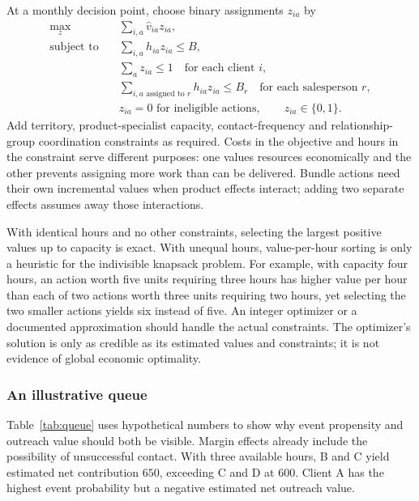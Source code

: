 At a monthly decision point, choose binary assignments $z_{ia}$ by
\begin{align}
 \max_z\quad &\sum_{i,a}\widehat v_{ia}z_{ia},\nonumber\\
 \text{subject to}\quad &\sum_{i,a}h_{ia}z_{ia}\le B,\nonumber\\
 &\sum_a z_{ia}\le1\quad\text{for each client }i,\nonumber\\
 &\sum_{i,a\text{ assigned to }r}h_{ia}z_{ia}\le B_r
       \quad\text{for each salesperson }r,\nonumber\\
 &z_{ia}=0\text{ for ineligible actions},\qquad z_{ia}\in\{0,1\}.
 \label{eq:mip}
\end{align}
Add territory, product-specialist capacity, contact-frequency and relationship-group coordination constraints as required. Costs in the objective and hours in the constraint serve different purposes: one values resources economically and the other prevents assigning more work than can be delivered. Bundle actions need their own incremental values when product effects interact; adding two separate effects assumes away those interactions.

With identical hours and no other constraints, selecting the largest positive values up to capacity is exact. With unequal hours, value-per-hour sorting is only a heuristic for the indivisible knapsack problem. For example, with capacity four hours, an action worth five units requiring three hours has higher value per hour than each of two actions worth three units requiring two hours, yet selecting the two smaller actions yields six instead of five. An integer optimizer or a documented approximation should handle the actual constraints. The optimizer's solution is only as credible as its estimated values and constraints; it is not evidence of global economic optimality.

\subsubsection{An illustrative queue}

Table~\ref{tab:queue} uses hypothetical numbers to show why event propensity and outreach value should both be visible. Margin effects already include the possibility of unsuccessful contact. With three available hours, B and C yield estimated net contribution $650$, exceeding C and D at $600$. Client A has the highest event probability but a negative estimated net outreach value.

